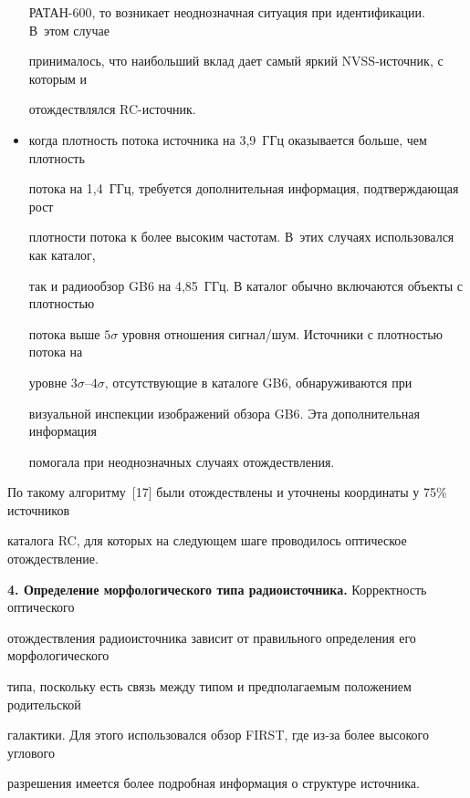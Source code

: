 \begin{multicols}{2}
\begin{itemize}
РАТАН-600, то возникает неоднозначная ситуация при идентификации. В~этом случае 

принималось, что наибольший вклад дает самый яркий NVSS-ис\-точ\-ник, с которым и 

отождествлялся RC-источник. 

\item когда плотность потока источника на 3,9~ГГц оказывается больше, чем плотность 

потока на 1,4~ГГц, требуется дополнительная информация, подтверждающая рост 

плотности потока к более высоким частотам. В~этих случаях использовался как каталог, 

так и радиообзор GB6 на 4,85~ГГц. В каталог обычно включаются объекты с плотностью 

потока выше $5\sigma$ уровня отношения сигнал/шум. Источники с плот\-ностью потока на 

уровне $3\sigma\mbox{--}4\sigma$, отсутствующие в каталоге GB6, обнаруживаются при 

визуальной инспекции изображений обзора GB6. Эта дополнительная информация 

помогала при неоднозначных случаях отождествления.

  \end{itemize}

  



  

По такому алгоритму~[17] были отождествлены и уточнены координаты у 75\% источников 

каталога RC, для которых на следующем шаге проводилось оптическое отождествление.






\textbf{4. Определение морфологического типа ра\-дио\-ис\-точ\-ни\-ка.} Корректность оптического 

отождествления радиоисточника зависит от правильного определения его морфологического 

типа, поскольку есть связь между типом и предполагаемым положением родительской 

галактики. Для этого использовался обзор FIRST, где из-за более высокого углового 

разрешения имеется более подробная информация о структуре источника. 

      


\end{multicols}
